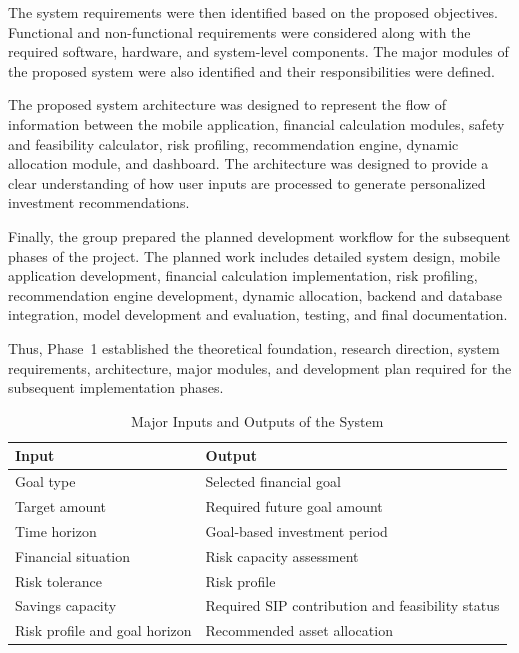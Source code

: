 The system requirements were then identified based on the proposed objectives. Functional and non-functional requirements were considered along with the required software, hardware, and system-level components. The major modules of the proposed system were also identified and their responsibilities were defined.

The proposed system architecture was designed to represent the flow of information between the mobile application, financial calculation modules, safety and feasibility calculator, risk profiling, recommendation engine, dynamic allocation module, and dashboard. The architecture was designed to provide a clear understanding of how user inputs are processed to generate personalized investment recommendations.

Finally, the group prepared the planned development workflow for the subsequent phases of the project. The planned work includes detailed system design, mobile application development, financial calculation implementation, risk profiling, recommendation engine development, dynamic allocation, backend and database integration, model development and evaluation, testing, and final documentation.

Thus, Phase~1 established the theoretical foundation, research direction, system requirements, architecture, major modules, and development plan required for the subsequent implementation phases.

\begin{table}[h!]
	\centering
	\caption{Major Inputs and Outputs of the System}
	\label{tab:io}
	\vspace*{5pt}
	{\singlespacing\small
	\begin{tabular}{|p{5.5cm}|p{7.5cm}|}
		\hline
		\textbf{Input} & \textbf{Output} \\ \hline
		Goal type & Selected financial goal \\ \hline
		Target amount & Required future goal amount \\ \hline
		Time horizon & Goal-based investment period \\ \hline
		Financial situation & Risk capacity assessment \\ \hline
		Risk tolerance & Risk profile \\ \hline
		Savings capacity & Required SIP contribution and feasibility status \\ \hline
		Risk profile and goal horizon & Recommended asset allocation \\ \hline
	\end{tabular}}
\end{table}

